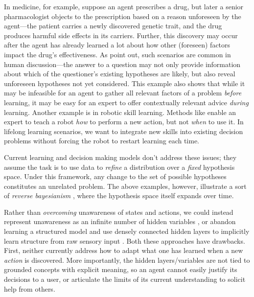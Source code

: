 \documentclass{article}
\begin{document}
	In medicine, for example, suppose an agent prescribes a drug, but later a senior pharmacologist objects to the prescription based on a reason unforeseen by the agent---the patient carries a newly discovered genetic trait, and the drug produces harmful side effects in its carriers. Further, this discovery may occur after the agent has already learned a lot about how other (foreseen) factors impact the drug's effectiveness. As \citet{coenen_asking_2017} point out, such scenarios are common in human discussion---the answer to a question may not only provide information about which of the questioner's existing hypotheses are likely, but also reveal unforeseen hypotheses not yet considered. This example also shows that while it may be infeasible for an agent to gather all relevant factors of a problem \emph{before} learning, it may be  easy for an expert to offer contextually relevant advice \emph{during} learning. Another example is in robotic skill learning. Methods like \citet{cakmak_designing_2012} enable an expert to teach a robot \emph{how} to perform a new action, but not \emph{when} to use it. In lifelong learning scenarios, we want to integrate new skills into existing decision problems without forcing the robot to restart learning each time.
	
	Current learning and decision making models don't address these issues; they assume the task is to use data to \emph{refine} a distribution over a \emph{fixed} hypothesis space. Under this framework, any change to the set of possible hypotheses constitutes an unrelated problem. The above examples, however, illustrate a sort of \emph{reverse bayesianism} \cite{karni_reverse_2013}, where the hypothesis space itself expands over time.
	
	Rather than \emph{overcoming} unawareness of states and actions, we could instead represent unawareness as an infinite number of hidden variables \cite{wood_non-parametric_2006}, or abandon learning a structured model and use densely connected hidden layers to implicitly learn structure from raw sensory input \cite{mnih_human-level_2015}. Both these approaches have drawbacks. First, neither currently address how to adapt what one has learned when a new \emph{action} is discovered. More importantly, the hidden layers/variables are not tied to grounded concepts with explicit meaning, so an agent cannot easily justify its decisions to a user, or articulate the limits of its current understanding to solicit help from others.
	
\end{document}
